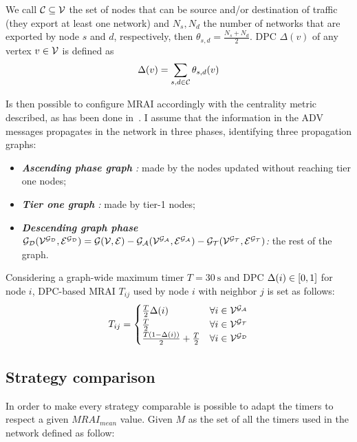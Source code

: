 We call $\mathcal{C} \subseteq \mathcal{V}$ the set of nodes that can be source
and/or destination of traffic (they export at least one network)
and $N_s, N_d$ the number of networks that are exported by node $s$ and $d$,
respectively, then $\theta_{s,d} = \frac{N_s + N_d}{2}$. \ac{DPC} $\Delta(v)$ of
any vertex $v\in \mathcal{V}$ is defined as
\begin{equation}
		\Delta(v) = \sum_{s,d\in \mathcal{C}} \theta_{s,d} (v)
		\label{eq:dpcv}
\end{equation}

Is then possible to configure \ac{MRAI} accordingly with the centrality metric
described, as has been done in~\cite{milani2020improving}.
I assume that the information in the \ac{ADV} messages propagates in the network
in three phases, identifying three propagation graphs:
\begin{itemize}
    \item \textit{\textbf{Ascending phase graph \ascentgraph}:} made by the
        nodes updated without reaching tier one nodes;
    \item \textit{\textbf{Tier one graph \tiergraph}:} made by tier-1 nodes;
    \item \textit{\textbf{Descending graph phase $\mathcal{\mathcal{G_{D}}(\mathcal{V^{\mathcal{G_{D}}}},\mathcal{E^{\mathcal{G_{D}}}})} = \mathcal{G(\mathcal{V},\mathcal{E})} - \mathcal{\mathcal{G_{A}}(\mathcal{V^{\mathcal{G_{A}}}},\mathcal{E^{\mathcal{G_{A}}}})} - \mathcal{\mathcal{G_{T}}(\mathcal{V^{\mathcal{G_{T}}}},\mathcal{E^{\mathcal{G_{T}}}})}$}:}
        the rest of the graph.
\end{itemize}

Considering a graph-wide maximum timer $T=\SI{30}{\second}$ and \ac{DPC}
$\Delta(i) \in [0,1]$ for node $i$, DPC-based \ac{MRAI} $T_{ij}$ used by node $i$
with neighbor $j$ is set as follows:
\begin{equation} \label{eq:dpc}
    T_{ij}=
    \begin{cases}
        \frac{T}{2}\Delta(i) & \forall i\in \mathcal{V^{\mathcal{G_{A}}}}  \\
    \frac{T}{2} & \forall i\in \mathcal{V^{\mathcal{G_{T}}}} \\
        \frac{T(1-\Delta(i))}{2}+\frac{T}{2} & \forall i\in \mathcal{V^{\mathcal{G_{D}}}}\\
    \end{cases}
\end{equation}

\subsection{Strategy comparison}
\label{subsec:bgp_mrai_strategy_comparison}

In order to make every strategy comparable is possible to adapt the timers to
respect a given $MRAI_{mean}$ value.
Given $M$ as the set of all the timers used in the network defined as follow:

